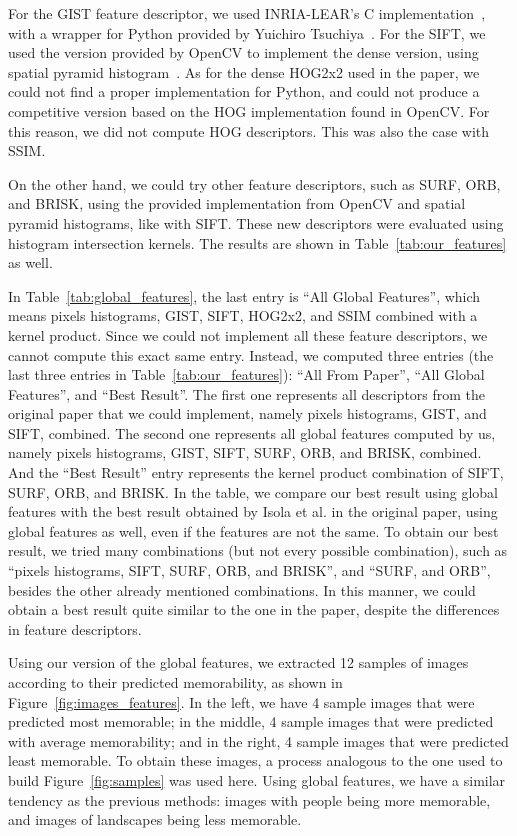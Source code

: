 \documentclass[10pt,twocolumn,letterpaper]{article}
\begin{document}
For the GIST feature descriptor, we used INRIA-LEAR's C implementation~\cite{lear_gist}, with a wrapper for Python provided by Yuichiro Tsuchiya~\cite{tuttieee}. For the SIFT, we used the version provided by OpenCV to implement the dense version, using spatial pyramid histogram~\cite{sift}. As for the dense HOG2x2 used in the paper, we could not find a proper implementation for Python, and could not produce a competitive version based on the HOG implementation found in OpenCV. For this reason, we did not compute HOG descriptors. This was also the case with SSIM.

On the other hand, we could try other feature descriptors, such as SURF, ORB, and BRISK, using the provided implementation from OpenCV and spatial pyramid histograms, like with SIFT. These new descriptors were evaluated using histogram intersection kernels. The results are shown in Table~\ref{tab:our_features} as well.

In Table~\ref{tab:global_features}, the last entry is ``All Global Features'', which means pixels histograms, GIST, SIFT, HOG2x2, and SSIM combined with a kernel product. Since we could not implement all these feature descriptors, we cannot compute this exact same entry. Instead, we computed three entries (the last three entries in Table~\ref{tab:our_features}): ``All From Paper'', ``All Global Features'', and ``Best Result''. The first one represents all descriptors from the original paper that we could implement, namely pixels histograms, GIST, and SIFT, combined. The second one represents all global features computed by us, namely pixels histograms, GIST, SIFT, SURF, ORB, and BRISK, combined. And the ``Best Result'' entry represents the kernel product combination of SIFT, SURF, ORB, and BRISK. In the table, we compare our best result using global features with the best result obtained by Isola et al. in the original paper, using global features as well, even if the features are not the same. To obtain our best result, we tried many combinations (but not every possible combination), such as ``pixels histograms, SIFT, SURF, ORB, and BRISK'', and ``SURF, and ORB'', besides the other already mentioned combinations. In this manner, we could obtain a best result quite similar to the one in the paper, despite the differences in feature descriptors.

Using our version of the global features, we extracted 12 samples of images according to their predicted memorability, as shown in Figure~\ref{fig:images_features}. In the left, we have 4 sample images that were predicted most memorable; in the middle, 4 sample images that were predicted with average memorability; and in the right, 4 sample images that were predicted least memorable. To obtain these images, a process analogous to the one used to build Figure~\ref{fig:samples} was used here. Using global features, we have a similar tendency as the previous methods: images with people being more memorable, and images of landscapes being less memorable.
\end{document}
